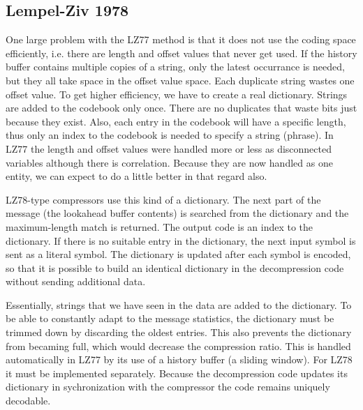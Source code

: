 \begin{frame}
\subsection*{Lempel-Ziv 1978}

One large problem with the LZ77 method is that it does not use the coding space efficiently, i.e. there are length and offset values that never get used. If the history buffer contains multiple copies of a string, only the latest occurrance is needed, but they all take space in the offset value space. Each duplicate string wastes one offset value.
To get higher efficiency, we have to create a real dictionary. Strings are added to the codebook only once. There are no duplicates that waste bits just because they exist. Also, each entry in the codebook will have a specific length, thus only an index to the codebook is needed to specify a string (phrase). In LZ77 the length and offset values were handled more or less as disconnected variables although there is correlation. Because they are now handled as one entity, we can expect to do a little better in that regard also.

LZ78-type compressors use this kind of a dictionary. The next part of the message (the lookahead buffer contents) is searched from the dictionary and the maximum-length match is returned. The output code is an index to the dictionary. If there is no suitable entry in the dictionary, the next input symbol is sent as a literal symbol. The dictionary is updated after each symbol is encoded, so that it is possible to build an identical dictionary in the decompression code without sending additional data.

Essentially, strings that we have seen in the data are added to the dictionary. To be able to constantly adapt to the message statistics, the dictionary must be trimmed down by discarding the oldest entries. This also prevents the dictionary from becaming full, which would decrease the compression ratio. This is handled automatically in LZ77 by its use of a history buffer (a sliding window). For LZ78 it must be implemented separately. Because the decompression code updates its dictionary in sychronization with the compressor the code remains uniquely decodable.
\end{frame}
